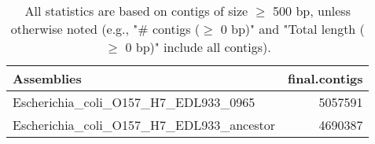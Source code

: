\documentclass[12pt,a4paper]{article}
\begin{document}
\begin{table}[ht]
\begin{center}
\caption{All statistics are based on contigs of size $\geq$ 500 bp, unless otherwise noted (e.g., "\# contigs ($\geq$ 0 bp)" and "Total length ($\geq$ 0 bp)" include all contigs).}
\begin{tabular}{|l*{1}{|r}|}
\hline
Assemblies & final.contigs \\ \hline
Escherichia\_coli\_O157\_H7\_EDL933\_0965 & 5057591 \\ \hline
Escherichia\_coli\_O157\_H7\_EDL933\_ancestor & 4690387 \\ \hline
\end{tabular}
\end{center}
\end{table}
\end{document}
